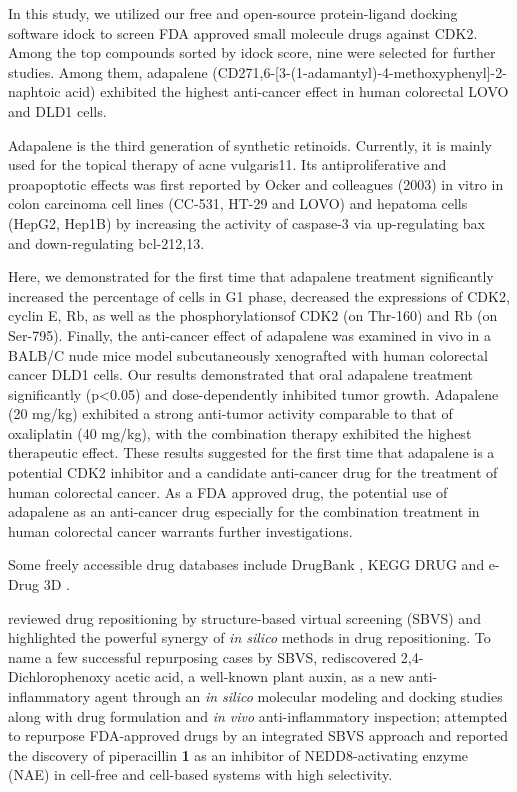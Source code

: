 In this study, we utilized our free and open-source protein-ligand docking software idock \citep{1153,1362} to screen FDA approved small molecule drugs against CDK2. Among the top compounds sorted by idock score, nine were selected for further studies. Among them, adapalene (CD271,6-[3-(1-adamantyl)-4-methoxyphenyl]-2-naphtoic acid) exhibited the highest anti-cancer effect in human colorectal LOVO and DLD1 cells.

Adapalene is the third generation of synthetic retinoids. Currently, it is mainly used for the topical therapy of acne vulgaris11. Its antiproliferative and proapoptotic effects was first reported by Ocker and colleagues (2003) in vitro in colon carcinoma cell lines (CC-531, HT-29 and LOVO) and hepatoma cells (HepG2, Hep1B) by increasing the activity of caspase-3 via up-regulating bax and down-regulating bcl-212,13.

Here, we demonstrated for the first time that adapalene treatment significantly increased the percentage of cells in G1 phase, decreased the expressions of CDK2, cyclin E, Rb, as well as the phosphorylationsof CDK2 (on Thr-160) and Rb (on Ser-795). Finally, the anti-cancer effect of adapalene was examined in vivo in a BALB/C nude mice model subcutaneously xenografted with human colorectal cancer DLD1 cells. Our results demonstrated that oral adapalene treatment significantly (p<0.05) and dose-dependently inhibited tumor growth. Adapalene (20 mg/kg) exhibited a strong anti-tumor activity comparable to that of oxaliplatin (40 mg/kg), with the combination therapy exhibited the highest therapeutic effect. These results suggested for the first time that adapalene is a potential CDK2 inhibitor and a candidate anti-cancer drug for the treatment of human colorectal cancer. As a FDA approved drug, the potential use of adapalene as an anti-cancer drug especially for the combination treatment in human colorectal cancer warrants further investigations.

Some freely accessible drug databases include DrugBank \citep{1594}, KEGG DRUG \citep{1595} and e-Drug 3D \citep{1125}.

\citep{1384} reviewed drug repositioning by structure-based virtual screening (SBVS) and highlighted the powerful synergy of \textit{in silico} methods in drug repositioning. To name a few successful repurposing cases by SBVS, \citep{1507} rediscovered 2,4-Dichlorophenoxy acetic acid, a well-known plant auxin, as a new anti-inflammatory agent through an \textit{in silico} molecular modeling and docking studies along with drug formulation and \textit{in vivo} anti-inflammatory inspection; \citep{1506} attempted to repurpose FDA-approved drugs by an integrated SBVS approach and reported the discovery of piperacillin \textbf{1} as an inhibitor of NEDD8-activating enzyme (NAE) in cell-free and cell-based systems with high selectivity.

